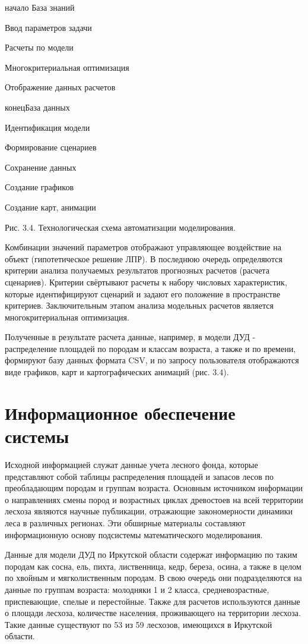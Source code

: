 \begin{center}
начало
База знаний

Ввод параметров задачи

Расчеты по модели

Многокритериальная оптимизация

Отображение данных расчетов

конецБаза данных

Идентификация модели

Формирование сценариев

Сохранение данных

Создание графиков

Создание карт, анимации

Рис. 3.4. Технологическая схема автоматизации
моделирования.
\end{center}

Комбинации значений параметров отображают
управляющее воздействие на объект (гипотетическое
решение ЛПР). В последнюю очередь определяются
критерии\textit{ }анализа получаемых результатов
прогнозных расчетов (расчета сценариев). Критерии
свёртывают расчеты к набору числовых характеристик,
которые идентифицируют сценарий и задают его
положение в пространстве\textit{ }критериев. Заключительным
этапом анализа модельных расчетов является
многокритериальная оптимизация.

Полученные в результате расчета данные, например,
в модели ДУД - распределение площадей по породам
и классам возраста, а также и по времени, формируют
базу данных формата CSV, и по запросу пользователя
отображаются виде графиков, карт и  картографических
анимаций (рис. 3.4).\label{HToc128995781}\label{HToc199746727}

\section{Информационное обеспечение системы}

Исходной информацией служат данные учета лесного
фонда, которые представляют собой таблицы распределения
площадей и запасов лесов по преобладающим породам
и группам возраста. Основным источником информации
о направлениях смены пород и возрастных циклах
древостоев на всей территории лесхоза являются
научные публикации, отражающие закономерности
динамики леса в различных регионах. Эти обширные
материалы составляют информационную основу
подсистемы математического моделирования.

Данные для модели ДУД по Иркутской области
содержат информацию по таким породам как сосна,
ель, пихта, лиственница, кедр, береза, осина,
а также в целом по хвойным и мягколиственным
породам. В свою очередь они подразделяются
на данные по группам возраста: молодняки 1 и
2 класса, средневозрастные, приспевающие, спелые
и перестойные. Также для расчетов используются
данные о площади лесхоза, количестве населения,
проживающего на территории лесхоза. Такие данные
существуют по 53 из 59 лесхозов, имеющихся в Иркутской
области.

